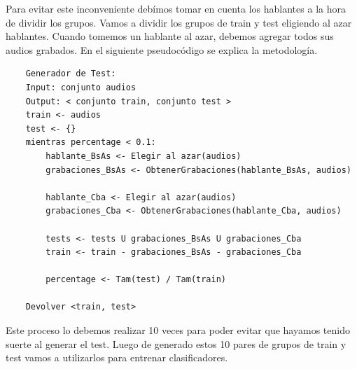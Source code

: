 \documentclass[11pt,a4paper,twoside]{tesis}
\begin{document}
Para evitar este inconveniente debímos tomar en cuenta los hablantes a la hora de dividir los grupos. Vamos a dividir los grupos de train y test eligiendo al azar hablantes. Cuando tomemos un hablante al azar, debemos agregar todos sus audios grabados. En el siguiente pseudocódigo se explica la metodología. 

\begin{lstlisting}
    Generador de Test:
    Input: conjunto audios
    Output: < conjunto train, conjunto test >
    train <- audios
    test <- {}
    mientras percentage < 0.1:
        hablante_BsAs <- Elegir al azar(audios)
        grabaciones_BsAs <- ObtenerGrabaciones(hablante_BsAs, audios)
    
        hablante_Cba <- Elegir al azar(audios)
        grabaciones_Cba <- ObtenerGrabaciones(hablante_Cba, audios)
    
        tests <- tests U grabaciones_BsAs U grabaciones_Cba
        train <- train - grabaciones_BsAs - grabaciones_Cba
    
        percentage <- Tam(test) / Tam(train) 
    
    Devolver <train, test>
\end{lstlisting}

Este proceso lo debemos realizar 10 veces para poder evitar que hayamos tenido suerte al generar el test. Luego de generado estos 10 pares de grupos de train y test vamos a utilizarlos para entrenar clasificadores.
\end{document}
